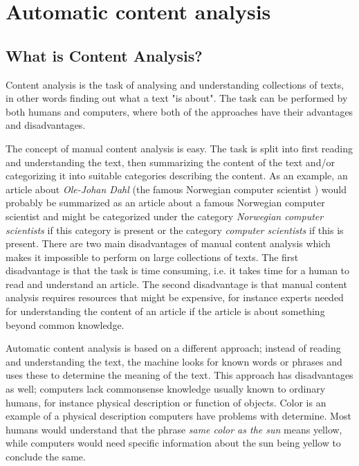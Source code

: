 \section{Automatic content analysis}

\subsection{What is Content Analysis?}
Content analysis is the task of analysing and understanding collections of texts, in other words finding out what a text "is about". The task can be performed by both humans and computers, where both of the approaches have their advantages and disadvantages.

The concept of manual content analysis is easy. The task is split into first reading and understanding the text, then summarizing the content of the text and/or categorizing it into suitable categories describing the content. As an example, an article about \emph{Ole-Johan Dahl} (the famous Norwegian computer scientist \cite{Olejohandahleng}) would probably be summarized as an article about a famous Norwegian computer scientist and might be categorized under the category \emph{Norwegian computer scientists} if this category is present or the category \emph{computer scientists} if this is present.  
There are two main disadvantages of manual content analysis which makes it impossible to perform on large collections of texts. The first disadvantage is that the task is time consuming, i.e. it takes time for a human to read and understand an article. The second disadvantage is that manual content analysis requires resources that might be expensive, for instance experts needed for understanding the content of an article if the article is about something beyond common knowledge.

Automatic content analysis is based on a different approach; instead of reading and understanding the text, the machine looks for known words or phrases and uses these to determine the meaning of the text. This approach has disadvantages as well; computers lack commonsense knowledge usually known to ordinary humans, for instance physical description or function of objects. Color is an example of a physical description computers have problems with determine. Most humans would understand that the phrase \emph{same color as the sun} means yellow, while computers would need specific information about the sun being yellow to conclude the same. 

